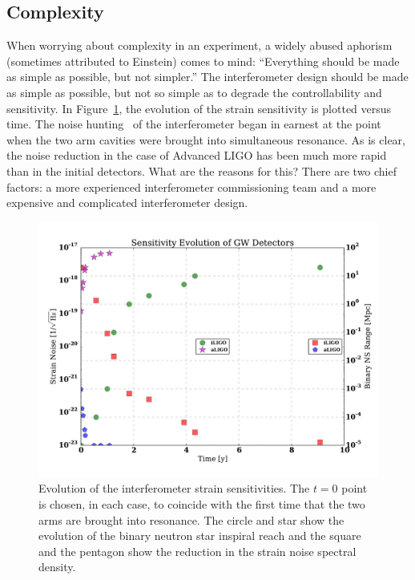 \subsection{Complexity}
\label{s:IDC:Complex}
When worrying about complexity in an experiment, a widely abused
aphorism (sometimes attributed to Einstein) comes to mind: 
``Everything should be made as simple as possible, but not simpler.''
The interferometer design should be made as simple as possible, but not so simple as to degrade the controllability and sensitivity.
In Figure~\ref{fig:IDC:SensEvo}, the evolution of the strain sensitivity is plotted
versus time. The noise hunting~\cite{Rana:PhD} of the interferometer began in earnest at the
point when the two arm cavities were brought into simultaneous resonance. As is
clear, the noise reduction in the case of Advanced LIGO has been much more rapid
than in the initial detectors. What are the reasons for this? There are two chief
factors: a more experienced interferometer commissioning team and a more expensive
and complicated interferometer design.

\begin{figure}[h]
\centering
\includegraphics[width=\columnwidth]{Figures/NoiseProgComp.pdf}
\caption{Evolution of the interferometer strain sensitivities. The $t = 0$
  point is chosen, in each case, to coincide with the first time that the
  two arms are brought into resonance. The circle and star show the evolution of
  the binary neutron star inspiral reach and the square and the pentagon show
  the reduction in the strain noise spectral density.}
\label{fig:IDC:SensEvo}
\end{figure}

